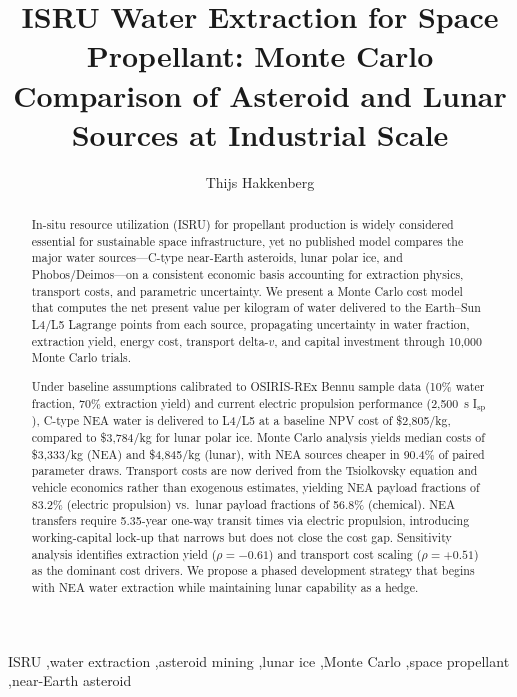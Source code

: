 \documentclass[preprint,12pt]{elsarticle}
\begin{document}
\begin{frontmatter}

\title{ISRU Water Extraction for Space Propellant: Monte Carlo Comparison of Asteroid and Lunar Sources at Industrial Scale}

\author[dyson]{Thijs Hakkenberg}

\address[dyson]{Project Dyson, Open Research Initiative}

\begin{abstract}
In-situ resource utilization (ISRU) for propellant production is widely considered essential for sustainable space infrastructure, yet no published model compares the major water sources---C-type near-Earth asteroids, lunar polar ice, and Phobos/Deimos---on a consistent economic basis accounting for extraction physics, transport costs, and parametric uncertainty. We present a Monte Carlo cost model that computes the net present value per kilogram of water delivered to the Earth--Sun L4/L5 Lagrange points from each source, propagating uncertainty in water fraction, extraction yield, energy cost, transport delta-$v$, and capital investment through 10,000 Monte Carlo trials.

Under baseline assumptions calibrated to OSIRIS-REx Bennu sample data (10\% water fraction, 70\% extraction yield) and current electric propulsion performance (2,500~s I$_\text{sp}$), C-type NEA water is delivered to L4/L5 at a baseline NPV cost of \$2,805/kg, compared to \$3,784/kg for lunar polar ice. Monte Carlo analysis yields median costs of \$3,333/kg (NEA) and \$4,845/kg (lunar), with NEA sources cheaper in 90.4\% of paired parameter draws. Transport costs are now derived from the Tsiolkovsky equation and vehicle economics rather than exogenous estimates, yielding NEA payload fractions of 83.2\% (electric propulsion) vs.\ lunar payload fractions of 56.8\% (chemical). NEA transfers require 5.35-year one-way transit times via electric propulsion, introducing working-capital lock-up that narrows but does not close the cost gap. Sensitivity analysis identifies extraction yield ($\rho = -0.61$) and transport cost scaling ($\rho = +0.51$) as the dominant cost drivers. We propose a phased development strategy that begins with NEA water extraction while maintaining lunar capability as a hedge.
\end{abstract}

\begin{keyword}
ISRU \sep water extraction \sep asteroid mining \sep lunar ice \sep Monte Carlo \sep space propellant \sep near-Earth asteroid
\end{keyword}

\end{frontmatter}
\end{document}
